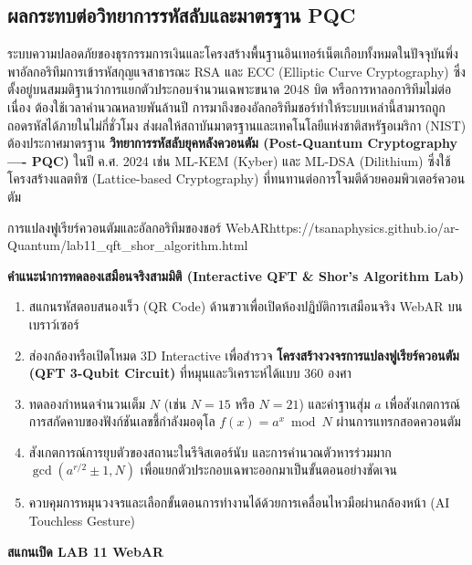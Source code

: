 \subsection{ผลกระทบต่อวิทยาการรหัสลับและมาตรฐาน PQC}
ระบบความปลอดภัยของธุรกรรมการเงินและโครงสร้างพื้นฐานอินเทอร์เน็ตเกือบทั้งหมดในปัจจุบันพึ่งพาอัลกอริทึมการเข้ารหัสกุญแจสาธารณะ RSA และ ECC (Elliptic Curve Cryptography) ซึ่งตั้งอยู่บนสมมติฐานว่าการแยกตัวประกอบจำนวนเฉพาะขนาด 2048 บิต หรือการหาลอการิทึมไม่ต่อเนื่อง ต้องใช้เวลาคำนวณหลายพันล้านปี การมาถึงของอัลกอริทึมชอร์ทำให้ระบบเหล่านี้สามารถถูกถอดรหัสได้ภายในไม่กี่ชั่วโมง ส่งผลให้สถาบันมาตรฐานและเทคโนโลยีแห่งชาติสหรัฐอเมริกา (NIST) ต้องประกาศมาตรฐาน \textbf{วิทยาการรหัสลับยุคหลังควอนตัม (Post-Quantum Cryptography ---- PQC)} ในปี ค.ศ. 2024 เช่น ML-KEM (Kyber) และ ML-DSA (Dilithium) ซึ่งใช้โครงสร้างแลตทิซ (Lattice-based Cryptography) ที่ทนทานต่อการโจมตีด้วยคอมพิวเตอร์ควอนตัม

\begin{qrcodelabbox}{การแปลงฟูเรียร์ควอนตัมและอัลกอริทึมของชอร์ WebAR}{https://tsanaphysics.github.io/ar-Quantum/lab11_qft_shor_algorithm.html}
\begin{minipage}[c]{0.70\textwidth}
\textbf{คำแนะนำการทดลองเสมือนจริงสามมิติ (Interactive QFT \& Shor's Algorithm Lab)}
\begin{enumerate}
    \item สแกนรหัสตอบสนองเร็ว (QR Code) ด้านขวาเพื่อเปิดห้องปฏิบัติการเสมือนจริง WebAR บนเบราว์เซอร์
    \item ส่องกล้องหรือเปิดโหมด 3D Interactive เพื่อสำรวจ \textbf{โครงสร้างวงจรการแปลงฟูเรียร์ควอนตัม (QFT 3-Qubit Circuit)} ที่หมุนและวิเคราะห์ได้แบบ 360 องศา
    \item ทดลองกำหนดจำนวนเต็ม $N$ (เช่น $N = 15$ หรือ $N = 21$) และค่าฐานสุ่ม $a$ เพื่อสังเกตการณ์การสกัดคาบของฟังก์ชันเลขชี้กำลังมอดุโล $f(x) = a^x \bmod N$ ผ่านการแทรกสอดควอนตัม
    \item สังเกตการณ์การยุบตัวของสถานะในรีจิสเตอร์นับ และการคำนวณตัวหารร่วมมาก $\gcd(a^{r/2} \pm 1, N)$ เพื่อแยกตัวประกอบเฉพาะออกมาเป็นขั้นตอนอย่างชัดเจน
    \item ควบคุมการหมุนวงจรและเลือกขั้นตอนการทำงานได้ด้วยการเคลื่อนไหวมือผ่านกล้องหน้า (AI Touchless Gesture)
\end{enumerate}
\end{minipage}
\hfill
\begin{minipage}[c]{0.25\textwidth}
\centering
{}
\vspace{4pt}
\scriptsize\textbf{สแกนเปิด LAB 11 WebAR}
\end{minipage}
\end{qrcodelabbox}

